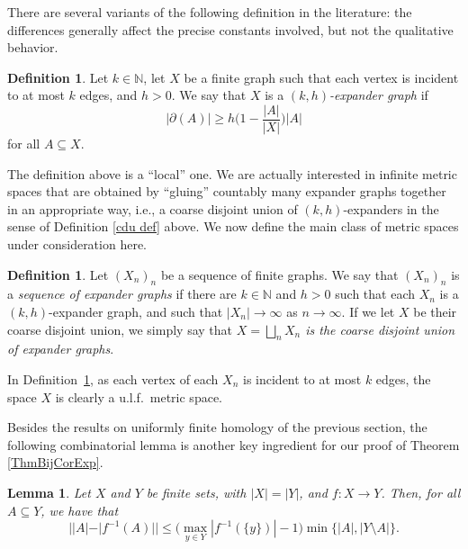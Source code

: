 \documentclass[11pt]{amsart}
\newcommand{\N}{\mathbb{N}}
\numberwithin{equation}{section}
\newtheorem{lemma}[theorem]{Lemma}
\theoremstyle{definition}
\newtheorem{definition}[theorem]{Definition}
\theoremstyle{remark}
\numberwithin{equation}{section}
\begin{document}

There are several variants of the following definition in the literature: the differences generally affect the precise constants involved, but not the qualitative behavior.

\begin{definition}\label{def:expander1}
Let $k\in\N$, let $X$ be a finite graph such that each vertex is incident to at most $k$ edges, and $h>0$. We say that $X$ is a \emph{$(k,h)$-expander graph} if \[|\partial( A)|\geq h\Big(1-\frac{|A|}{|X|}\Big)|A|\]
for all $A\subseteq X$.
\end{definition}

The definition above is a ``local'' one. We are actually interested in infinite metric spaces that are obtained by ``gluing'' countably many expander graphs together in an appropriate way, i.e., a coarse disjoint union of $(k,h)$-expanders in the sense of Definition \ref{cdu def} above. We now define the main class of metric spaces under consideration here. 
 
 \begin{definition}\label{def:expander2}
Let $(X_n)_n$ be a sequence of finite graphs. We say that $(X_n)_n$ is a \emph{sequence of expander graphs} if there are $k\in\N$ and $h>0$ such that each $X_n$ is a $(k,h)$-expander graph, and such that $|X_n|\to\infty$ as $n\to\infty$. If we let $X$ be their coarse disjoint union, we simply say that \emph{$X=\bigsqcup_nX_n$ is the coarse disjoint union of expander graphs}.
\end{definition}
 
In Definition~\ref{def:expander2}, as each vertex of each $X_n$ is incident to at most $k$ edges, the space $X$ is clearly a u.l.f.\ metric space. 
 
Besides the results on uniformly finite homology of the previous section, the following combinatorial lemma is another key ingredient for our proof of Theorem \ref{ThmBijCorExp}.

 \begin{lemma}\label{LemmaEasy}
Let $X$ and $Y$ be finite sets, with $|X|=|Y|$, and $f\colon X\to Y$. Then, for all $A\subseteq Y$, we have that 
\[
||A|-|f^{-1}(A)||\leq \Big(\max_{y\in Y}|f^{-1}(\{y\})|-1\Big)\min\{|A|,|Y\setminus A|\}.
\]
\end{lemma}
\end{document}
